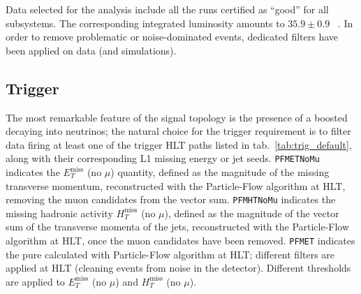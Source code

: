 \noindent Data selected for the analysis include all the runs certified as ``good'' for all subsystems. The corresponding integrated luminosity amounts to $35.9 \pm 0.9$ \fbinv~\cite{CMS:2017sdi}. In order to remove problematic or noise-dominated events, dedicated \MET filters have been applied on data (and simulations).

\subsection{Trigger}
\label{ssec:trigger}
The most remarkable feature of the signal topology is the presence of a boosted \Z decaying into neutrinos; the natural choice for the trigger requirement is to filter data firing at least one of the \met trigger HLT paths listed in tab.~\ref{tab:trig_default}, along with their corresponding L1 missing energy or jet seeds. {\tt PFMETNoMu} indicates the $E_T^{\text{miss}}$ (no $\mu$) quantity, defined as the magnitude of the missing transverse momentum, reconstructed with the Particle-Flow algorithm at HLT, removing the muon candidates from the vector sum. {\tt PFMHTNoMu} indicates the missing hadronic activity $H_T^{\text{miss}}$ (no $\mu$), defined as the magnitude of the vector sum of the transverse momenta of the jets, reconstructed with the Particle-Flow algorithm at HLT, once the muon candidates have been removed. {\tt PFMET} indicates the pure \MET calculated with Particle-Flow algorithm at HLT; different filters are applied at HLT (cleaning events from noise in the detector). Different thresholds are applied to $E_T^{\text{miss}}$ (no $\mu$) and $H_T^{\text{miss}}$ (no $\mu$).

